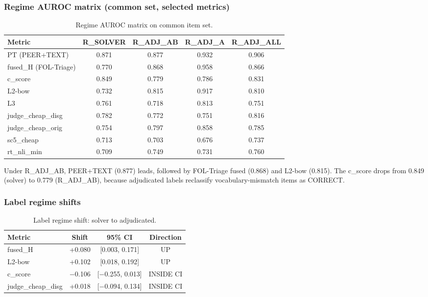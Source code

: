 \documentclass[11pt,letterpaper]{article}
\begin{document}
\subsubsection{Regime AUROC matrix (common set, selected metrics)}

\begin{table}[!htbp]
\centering
\caption{Regime AUROC matrix on common item set.}
\label{tab:regime_auroc}
\begin{tabular}{lcccc}
\toprule
Metric & R\_SOLVER & R\_ADJ\_AB & R\_ADJ\_A & R\_ADJ\_ALL \\
\midrule
PT (PEER+TEXT) & 0.871 & 0.877 & 0.932 & 0.906 \\
fused\_H (FOL-Triage) & 0.770 & 0.868 & 0.958 & 0.866 \\
c\_score & 0.849 & 0.779 & 0.786 & 0.831 \\
L2-bow & 0.732 & 0.815 & 0.917 & 0.810 \\
L3 & 0.761 & 0.718 & 0.813 & 0.751 \\
judge\_cheap\_disg & 0.782 & 0.772 & 0.751 & 0.816 \\
judge\_cheap\_orig & 0.754 & 0.797 & 0.858 & 0.785 \\
sc5\_cheap & 0.713 & 0.703 & 0.676 & 0.737 \\
rt\_nli\_min & 0.709 & 0.749 & 0.731 & 0.760 \\
\bottomrule
\end{tabular}
\end{table}

Under R\_ADJ\_AB, PEER+TEXT (0.877) leads, followed by FOL-Triage fused (0.868) and L2-bow (0.815). The c\_score drops from 0.849 (solver) to 0.779 (R\_ADJ\_AB), because adjudicated labels reclassify vocabulary-mismatch items as CORRECT.

\subsubsection{Label regime shifts}

\begin{table}[!htbp]
\centering
\caption{Label regime shift: solver to adjudicated.}
\label{tab:regime_shift}
\begin{tabular}{lccc}
\toprule
Metric & Shift & 95\% CI & Direction \\
\midrule
fused\_H & +0.080 & [0.003, 0.171] & UP \\
L2-bow & +0.102 & [0.018, 0.192] & UP \\
c\_score & $-$0.106 & [$-$0.255, 0.013] & INSIDE CI \\
judge\_cheap\_disg & +0.018 & [$-$0.094, 0.134] & INSIDE CI \\
\bottomrule
\end{tabular}
\end{table}
\end{document}
